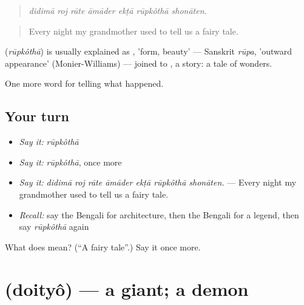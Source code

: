 \begin{quote}
      
\end{quote}

\begin{quote}
\emph{didimā roj rāte āmāder ekṭā rūpkôthā shonāten.}
\end{quote}

\begin{quote}
Every night my grandmother used to tell us a fairy tale.
\end{quote}

\begin{cousinweb}
\textbf{} (\emph{rūpkôthā}) is usually explained as , 'form, beauty' — Sanskrit \emph{rūpa}, 'outward appearance' (Monier-Williams) — joined to \textbf{}, a story: a tale of wonders.
\end{cousinweb}

\begin{grammarlens}[title={What you've built}]
One more word for telling what happened.
\end{grammarlens}

\subsection*{Your turn}
\begin{itemize}
\raggedright
  \item \emph{Say it:} \emph{rūpkôthā}
  \item \emph{Say it:} \emph{rūpkôthā}, once more
  \item \emph{Say it:} \emph{didimā roj rāte āmāder ekṭā rūpkôthā shonāten.} — Every night my grandmother used to tell us a fairy tale.
  \item \emph{Recall:} say the Bengali for architecture, then the Bengali for a legend, then say \emph{rūpkôthā} again
\end{itemize}

\begin{tcolorbox}[breakable,colback=teal!4,colframe=teal!35!black,title={Before you move on}]
What does  mean? (\textquotedblleft{}A fairy tale\textquotedblright{}.) Say it once more.
\end{tcolorbox}
\section[\texorpdfstring{\bn{দৈত্য} (doityô)}{দৈত্য (doityô)}]{ (doityô) — a giant; a demon}

